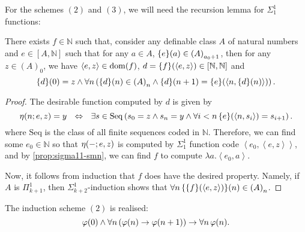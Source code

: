 \documentclass[11pt]{article}
\theoremstyle{plain}
\theoremstyle{definition}
\newcommand{\tuple}[1]{\left\langle #1 \right\rangle}
\newcommand{\Seq}{\mathrm{Seq}}
\DeclareMathOperator{\dom}{dom}
\begin{document}
For the schemes $\left(2\right)$ and $\left(3\right)$, we will need the recursion lemma for $\Sigma^1_1$ functions:

\begin{lemma}[$\AC$]
    There exists $f \in \mathbb{N}$ such that, consider any definable class $A$ of natural numbers and $e \in \left[A, \mathbb{N}\right]$ such that for any $a \in A$, $\mleft\{e\mright\}\mleft(a\mright) \in \left(A\right)_{a_0 + 1}$, then for any $z \in \left(A\right)_0$, we have $\tuple{e, z} \in \dom\mleft(f\mright)$, $d = \mleft\{f\mright\}\mleft(\tuple{e, z}\mright) \in \left[\mathbb{N}, \mathbb{N}\right]$ and
    \[\mleft\{d\mright\}\mleft(0\mright) = z \land \forall n \left(\mleft\{d\mright\}\mleft(n\mright) \in \left(A\right)_n \land \mleft\{d\mright\}\mleft(n + 1\mright) = \mleft\{e\mright\}\mleft(\tuple{n, \mleft\{d\mright\}\mleft(n\mright)}\mright)\right).\]
\end{lemma}

\begin{proof}
    The desirable function computed by $d$ is given by
    \[\eta\mleft(n; e, z\mright) = y \ \ \ratio\Leftrightarrow \ \ \exists s \in \Seq \left(s_0 = z \land s_n = y \land \forall i < n \, \mleft\{e\mright\}\mleft(\tuple{n, s_i}\mright) = s_{i + 1}\right).\]
    where $\Seq$ is the class of all finite sequences coded in $\mathbb{N}$. Therefore, we can find some $e_0 \in \mathbb{N}$ so that $\eta\mleft({-}; e, z\mright)$ is computed by $\Sigma^1_1$ function code $\tuple{e_0, \tuple{e, z}}$, and by \autoref{prop:sigma11-smn}, we can find $f$ to compute $\lambda a. \tuple{e_0, a}$.

    Now, it follows from induction that $f$ does have the desired property. Namely, if $A$ is $\Pi^1_{k + 1}$, then $\Sigma^1_{k + 2}$-induction shows that $\forall n \, \mleft\{\mleft\{f\mright\}\mleft(\tuple{e, z}\mright)\mright\}\mleft(n\mright) \in \left(A\right)_n$.
\end{proof}

\begin{proposition}
    The induction scheme $\left(2\right)$ is realised:
    \[\varphi\mleft(0\mright) \land \forall n \left(\varphi\mleft(n\mright) \rightarrow \varphi\mleft(n + 1\mright)\right) \rightarrow \forall n \, \varphi\mleft(n\mright).\]
\end{proposition}
\end{document}
